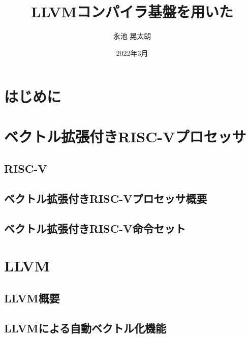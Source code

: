 \documentclass[a4paper,11pt,fleqn]{jbook}
\title{LLVMコンパイラ基盤を用いた}
\author{永池 晃太朗}
\date{2022年3月}
\begin{document}
\maketitle

\begin{jabstract}

\end{jabstract}

\begin{abstract}
\end{abstract}

\newpage
\tableofcontents    %


\newpage
\chapter{はじめに}
\label{chp:intro}   %



\newpage
\chapter{ベクトル拡張付きRISC-Vプロセッサ}
\label{chp:2}


\section{RISC-V}
\label{chp:2_1}

\section{ベクトル拡張付きRISC-Vプロセッサ概要}
\label{chp:2_2}

\section{ベクトル拡張付きRISC-V命令セット}
\label{chp:2_3}



\newpage
\chapter{LLVM}
\label{chp:3}

\section{LLVM概要}
\label{chp:3_1}

\section{LLVMによる自動ベクトル化機能}
\label{chp:3_2}

\end{document}
